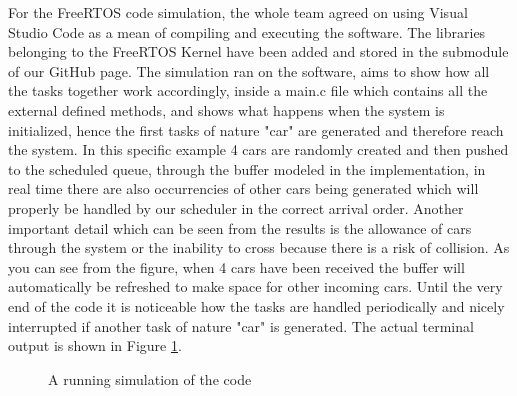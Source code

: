 \documentclass[conference]{IEEEtran}
\begin{document}
For the FreeRTOS code simulation, the whole team agreed on using Visual Studio Code as a mean of compiling and executing the software. The libraries belonging to the FreeRTOS Kernel have been added and stored in the submodule of our GitHub page. The simulation ran on the software, aims to show how all the tasks together work accordingly, inside a main.c file which contains all the external defined methods, and shows what happens when the system is initialized, hence the first tasks of nature "car" are generated and therefore reach the system. In this specific example 4 cars are randomly created and then pushed to the scheduled queue, through the buffer modeled in the implementation, in real time there are also occurrencies of other cars being generated which will properly be handled by our scheduler in the correct arrival order. Another important detail which can be seen from the results is the allowance of cars through the system or the inability to cross because there is a risk of collision. As you can see from the figure, when 4 cars have been received the buffer will automatically be refreshed to make space for other incoming cars. Until the very end of the code it is noticeable how the tasks are handled periodically and nicely interrupted if another task of nature "car" is generated. The actual terminal output is shown in Figure \ref{freertos-sim}.
\begin{figure}[h]
    \caption{A running simulation of the code}
    \label{freertos-sim}
\end{figure}
\end{document}
